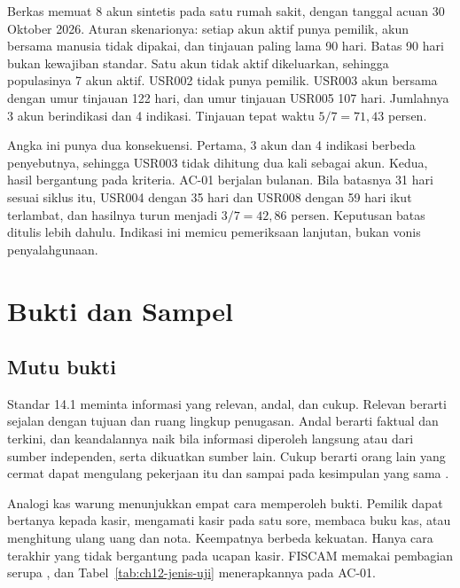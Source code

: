 \begin{kasus}[title={Kasus Medikara Health: Potret Delapan Baris}]
Berkas  memuat 8 akun sintetis pada satu rumah
sakit, dengan tanggal acuan 30 Oktober 2026. Aturan skenarionya: setiap akun aktif punya pemilik,
akun bersama manusia tidak dipakai, dan tinjauan paling lama 90 hari. Batas 90 hari bukan kewajiban
standar. Satu akun tidak aktif dikeluarkan, sehingga populasinya 7 akun aktif. USR002 tidak punya
pemilik. USR003 akun bersama dengan umur tinjauan 122 hari, dan umur tinjauan USR005 107 hari.
Jumlahnya 3 akun berindikasi dan 4 indikasi. Tinjauan tepat waktu $5 / 7 = 71{,}43$ persen.

Angka ini punya dua konsekuensi. Pertama, 3 akun dan 4 indikasi berbeda penyebutnya, sehingga USR003
tidak dihitung dua kali sebagai akun. Kedua, hasil bergantung pada kriteria. AC-01 berjalan bulanan.
Bila batasnya 31 hari sesuai siklus itu, USR004 dengan 35 hari dan USR008 dengan 59 hari ikut
terlambat, dan hasilnya turun menjadi $3 / 7 = 42{,}86$ persen. Keputusan batas ditulis lebih
dahulu. Indikasi ini memicu pemeriksaan lanjutan, bukan vonis penyalahgunaan.
\end{kasus}

\section{Bukti dan Sampel}

\subsection*{Mutu bukti}

Standar 14.1 meminta informasi yang relevan, andal, dan cukup. Relevan berarti sejalan dengan tujuan
dan ruang lingkup penugasan. Andal berarti faktual dan terkini, dan keandalannya naik bila informasi
diperoleh langsung atau dari sumber independen, serta dikuatkan sumber lain. Cukup berarti orang
lain yang cermat dapat mengulang pekerjaan itu dan sampai pada kesimpulan yang sama
\cite{iia-gias2024}.

Analogi kas warung menunjukkan empat cara memperoleh bukti. Pemilik dapat bertanya kepada kasir,
mengamati kasir pada satu sore, membaca buku kas, atau menghitung ulang uang dan nota. Keempatnya
berbeda kekuatan. Hanya cara terakhir yang tidak bergantung pada ucapan kasir. FISCAM memakai
pembagian serupa \cite{c12-fiscam2026}, dan Tabel~\ref{tab:ch12-jenis-uji} menerapkannya pada AC-01.

